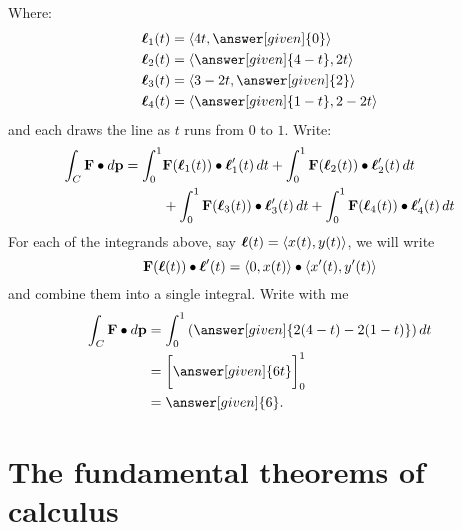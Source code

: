 \documentclass{ximera}
\begin{document}
\begin{example}
\begin{explanation}
\begin{image}
    \end{image}
    Where:
    \begin{align*}
      \vecl_1(t) &= \vector{4t,\answer[given]{0}}\\
      \vecl_2(t) &= \vector{\answer[given]{4-t},2t}\\
      \vecl_3(t) &= \vector{3-2t,\answer[given]{2}}\\
      \vecl_4(t) &= \vector{\answer[given]{1-t},2-2t}
    \end{align*}
    and each draws the line as $t$ runs from $0$ to $1$.  Write:
    \begin{align*}
    \int_C \mathbf{F}\bullet\mathop{}\!d\mathbf{p} = \int_0^1 &\mathbf{F}(\boldsymbol{\ell}_1(t))\bullet \boldsymbol{\ell}_1'(t) \mathop{}\!d t
    + \int_0^1 \mathbf{F}(\boldsymbol{\ell}_2(t))\bullet \boldsymbol{\ell}_2'(t) \mathop{}\!d t\\
    &+ \int_0^1 \mathbf{F}(\boldsymbol{\ell}_3(t))\bullet \boldsymbol{\ell}_3'(t) \mathop{}\!d t
    + \int_0^1 \mathbf{F}(\boldsymbol{\ell}_4(t))\bullet \boldsymbol{\ell}_4'(t) \mathop{}\!d t
    \end{align*}
    For each of the integrands above, say $\boldsymbol{\ell}(t) =
    \left\langle x(t),y(t)\right\rangle$, we will write
    \[
    \mathbf{F}(\boldsymbol{\ell}(t))\bullet \boldsymbol{\ell}'(t) = \left\langle 0,x(t)\right\rangle \bullet \left\langle x'(t),y'(t)\right\rangle
    \]
    and combine them into a single integral. Write with me
    \begin{align*}
      \int_C \vec{F}\dotp\d\vec{p} &= \int_0^1 \left(\answer[given]{2(4-t) -2(1-t)} \right)\d t\\
      &= \eval{\answer[given]{6t}}_0^1\\
      &=\answer[given]{6}. 
    \end{align*}
  \end{explanation}
\end{example}



\section{The fundamental theorems of calculus}
\end{document}
